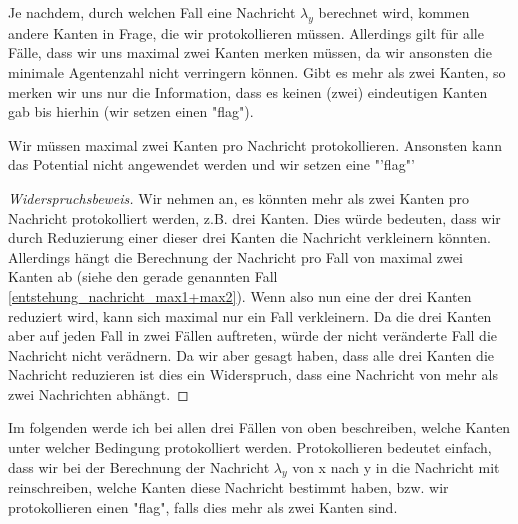 Je nachdem, durch welchen Fall eine Nachricht $\lambda_{y}$ berechnet wird, kommen andere Kanten in Frage, die wir protokollieren müssen.
Allerdings gilt für alle Fälle, dass wir uns maximal zwei Kanten merken müssen, da wir ansonsten die minimale Agentenzahl nicht verringern können. Gibt es mehr als zwei Kanten, so merken wir uns nur die Information, dass es keinen (zwei) eindeutigen Kanten gab bis hierhin (wir setzen einen "flag").

\begin{theorem}
	Wir müssen maximal zwei Kanten pro Nachricht protokollieren. Ansonsten kann das Potential nicht angewendet werden und wir setzen eine "'flag"'
\end{theorem}

\begin{proof}[Widerspruchsbeweis]
	Wir nehmen an, es könnten mehr als zwei Kanten pro Nachricht protokolliert werden, z.B. drei Kanten. Dies würde bedeuten, dass wir durch Reduzierung einer dieser drei Kanten die Nachricht verkleinern könnten. Allerdings hängt die Berechnung der Nachricht pro Fall von maximal zwei Kanten ab (siehe den gerade genannten Fall \ref{entstehung_nachricht_max1+max2}). Wenn also nun eine der drei Kanten reduziert wird, kann sich maximal nur ein Fall verkleinern. Da die drei Kanten aber auf jeden Fall in zwei Fällen auftreten, würde der nicht veränderte Fall die Nachricht nicht verädnern. Da wir aber gesagt haben, dass alle drei Kanten die Nachricht reduzieren ist dies ein Widerspruch, dass eine Nachricht von mehr als zwei Nachrichten abhängt.
\end{proof}

Im folgenden werde ich bei allen drei Fällen von oben beschreiben, welche Kanten unter welcher Bedingung protokolliert werden. Protokollieren bedeutet einfach, dass wir bei der Berechnung der Nachricht $\lambda_{y}$ von x nach y  in die Nachricht mit reinschreiben, welche Kanten diese Nachricht bestimmt haben, bzw. wir protokollieren einen "flag", falls dies mehr als zwei Kanten sind.

